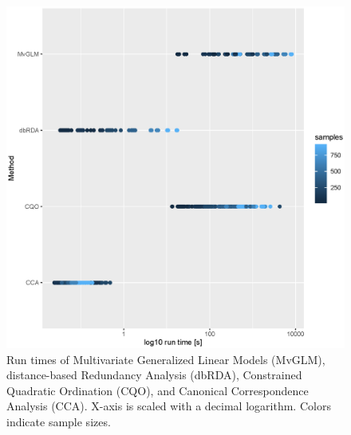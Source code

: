 \documentclass[a4paper,11pt]{article}
\begin{document}
    \begin{figure}[!htbp]
        \centering
        \includegraphics[scale =0.6]{runtimeplot}
        \caption{
        Run times of Multivariate Generalized Linear Models (MvGLM), distance-based Redundancy Analysis (dbRDA), Constrained Quadratic Ordination (CQO), and Canonical Correspondence Analysis (CCA). X-axis is scaled with a decimal logarithm. Colors indicate sample sizes.
        }
        \label{fig:runtime}
    \end{figure}{}

\end{document}
